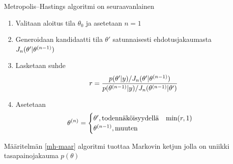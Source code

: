 \begin{maar}\label{mh-maar}
	Metropolis--Hastings algoritmi on seuraavanlainen
	\begin{enumerate}
		\item Valitaan aloitus tila $\theta_0$ ja asetetaan $n=1$
		\item Generoidaan kandidaatti tila $\theta'$ satunnaisesti ehdotusjakaumasta $J_n(\theta'|\theta^{(n-1)})$
		\item Lasketaan suhde
		\begin{displaymath}
			r = \frac{p(\theta'|y)/J_n(\theta'|\theta^{(n-1)})}{p(\theta^{(n-1)}|y)/J_n(\theta^{(n-1)}|\theta')}
		\end{displaymath}
		\item Asetetaan
		\begin{displaymath}
			\theta^{(n)}= 
			\begin{cases}
				\theta', \text{todennäköisyydellä} \hspace{0.3cm} \min(r,1) \\
				\theta^{(n-1)}, \text{muuten}
			\end{cases}
		\end{displaymath}
	\end{enumerate}
\end{maar}

\begin{lause}
	Määritelmän \ref{mh-maar} algoritmi tuottaa Markovin ketjun jolla on uniikki tasapainojakauma $p(\theta)$ 
\end{lause}

